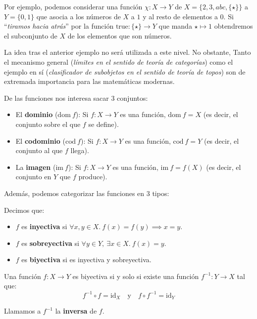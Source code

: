 \documentclass[10pt]{article}
\newcommand{\dom}{\mathrm{dom}\:}
\newcommand{\cod}{\mathrm{cod}\:}
\newcommand{\im}{\mathrm{im}\:}
\begin{document}
\begin{example}
  Por ejemplo, podemos considerar una función $ \chi : X \to Y $ de $ X = \{2, 3, abc, \{\star\}\} $ a $ Y = \{0, 1\} $ que asocia a los
  números de $ X $ a $ 1 $ y al resto de elementos a $ 0 $. Si ``\textit{tiramos hacia atrás}'' por la función $ \text{true} : \{\star\} \to Y $ que manda $ \star \mapsto 1 $
  obtendremos el subconjunto de $ X $ de los elementos que son números.
\end{example}

La idea tras el anterior ejemplo no será utilizada a este nivel. No obstante, Tanto el mecanismo general (\textit{límites en el sentido de teoría de categorías}) como el ejemplo
en sí (\textit{clasificador de subobjetos en el sentido de teoría de topos}) son de extremada importancia para las matemáticas modernas.

De las funciones nos interesa sacar 3 conjuntos:

\begin{definition}
  \begin{itemize}
    \item El \textbf{dominio} ($\dom f $): Si $ f : X \to Y $ es una función, $ \dom f = X $ (es decir, el conjunto sobre el que $ f $ se define).
    \item El \textbf{codominio} ($\cod f $): Si $ f : X \to Y $ es una función, $ \cod f = Y $ (es decir, el conjunto al que $ f $ llega).
    \item La \textbf{imagen} ($\im f $): Si $ f : X \to Y $ es una función, $ \im f = f(X) $ (es decir, el conjunto en $ Y $ que $ f $ produce).
  \end{itemize}
\end{definition}

Además, podemos categorizar las funciones en 3 tipos:

\begin{definition}
  Decimos que:
  \begin{itemize}
    \item $f$ es \textbf{inyectiva} si $ \forall x, y \in X.\ f(x) = f(y) \implies x = y $.
    \item $f$ es \textbf{sobreyectiva} si $\forall y \in Y,\ \exists x \in X.\ f(x) = y$.
    \item $f$ es \textbf{biyectiva} si es inyectiva y sobreyectiva.
  \end{itemize}
\end{definition}

\begin{theorem}
  Una función $f : X \to Y$ es biyectiva si y solo si existe una función $f^{-1} : Y \to X$ tal que:
  \[ f^{-1} \circ f = \mathrm{id}_X \quad \text{y} \quad f \circ f^{-1} = \mathrm{id}_Y \]

  Llamamos a $ f^{-1} $ la \textbf{inversa} de $ f $.
\end{theorem}
\end{document}
